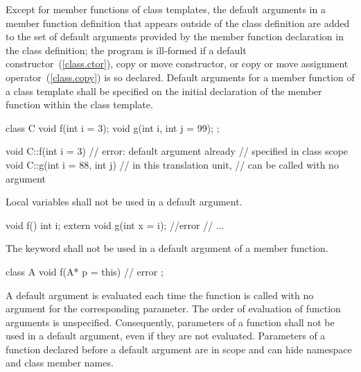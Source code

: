\pnum
Except for member functions of class templates, the
default arguments in a member function definition that appears
outside of the class definition
are added to the set of default arguments provided by the
member function declaration in the class definition;
the program is ill-formed if a default constructor~(\ref{class.ctor}),
copy or move constructor, or copy or move assignment operator~(\ref{class.copy})
is so declared.
Default arguments for a member function of a class template
shall be specified on the initial declaration of the member
function within the class template.
\enterexample

\begin{codeblock}
class C {
  void f(int i = 3);
  void g(int i, int j = 99);
};

void C::f(int i = 3) {          // error: default argument already
}                               // specified in class scope
void C::g(int i = 88, int j) {  // in this translation unit,
}                               //  can be called with no argument
\end{codeblock}
\exitexample

\pnum
Local variables shall not be used in a default argument.
\enterexample

\begin{codeblock}
void f() {
  int i;
  extern void g(int x = i);     //error
  // ...
}
\end{codeblock}
\exitexample

\pnum
The keyword
shall not be used in a default argument of a member function.
\enterexample

\begin{codeblock}
class A {
  void f(A* p = this) { }       // error
};
\end{codeblock}
\exitexample

\pnum
{}%
A default argument is evaluated each time the function is called
with no argument for the corresponding parameter.
The order of evaluation of function arguments is
unspecified.
%
%
Consequently,
parameters of a function shall not be used in a default argument,
even if they are not evaluated.
%
Parameters of a function declared before a default argument
are in scope and can hide namespace and class member names.
\enterexample

